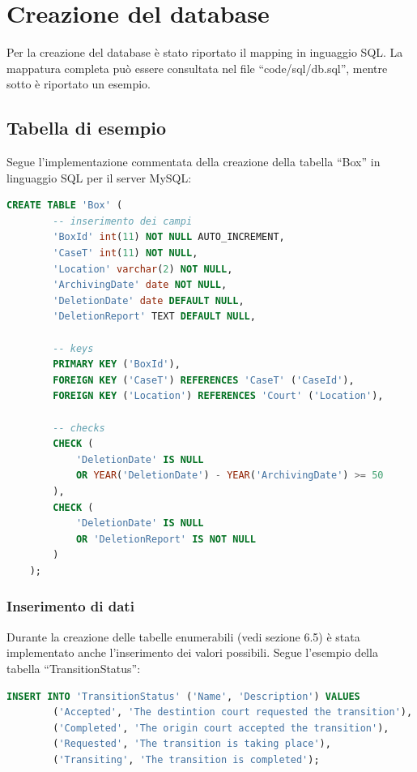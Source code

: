 {\section{Creazione del database}

Per la creazione del database è stato riportato il mapping in inguaggio SQL. La mappatura completa può essere consultata nel file ``code/sql/db.sql'', mentre sotto è riportato un esempio.

\subsection{Tabella di esempio}

Segue l'implementazione commentata della creazione della tabella ``Box'' in linguaggio SQL per il server MySQL:
\begin{lstlisting}[language=sql]
    CREATE TABLE 'Box' (
        -- inserimento dei campi
        'BoxId' int(11) NOT NULL AUTO_INCREMENT,
        'CaseT' int(11) NOT NULL,
        'Location' varchar(2) NOT NULL,
        'ArchivingDate' date NOT NULL,
        'DeletionDate' date DEFAULT NULL,
        'DeletionReport' TEXT DEFAULT NULL,

        -- keys
        PRIMARY KEY ('BoxId'),
        FOREIGN KEY ('CaseT') REFERENCES 'CaseT' ('CaseId'),
        FOREIGN KEY ('Location') REFERENCES 'Court' ('Location'),

        -- checks
        CHECK (
            'DeletionDate' IS NULL 
            OR YEAR('DeletionDate') - YEAR('ArchivingDate') >= 50
        ),
        CHECK (
            'DeletionDate' IS NULL 
            OR 'DeletionReport' IS NOT NULL
        )
    );
\end{lstlisting}

\subsubsection{Inserimento di dati}

Durante la creazione delle tabelle enumerabili (vedi sezione 6.5) è stata implementato anche l'inserimento dei valori possibili. Segue l'esempio della tabella ``TransitionStatus'':
\begin{lstlisting}[language=sql]
    INSERT INTO 'TransitionStatus' ('Name', 'Description') VALUES
        ('Accepted', 'The destintion court requested the transition'),
        ('Completed', 'The origin court accepted the transition'),
        ('Requested', 'The transition is taking place'),
        ('Transiting', 'The transition is completed');
\end{lstlisting}

}
